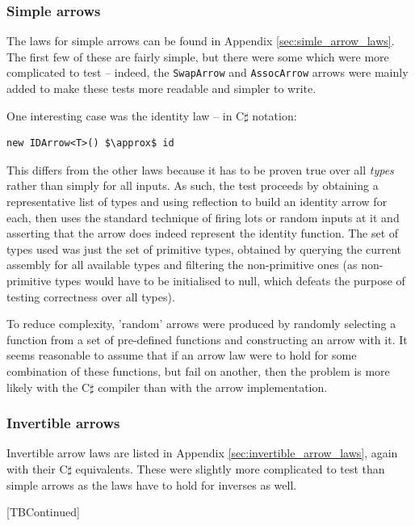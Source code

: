 \documentclass[12pt,twoside,notitlepage]{report}
\begin{document}
\subsubsection{Simple arrows}

The laws for simple arrows can be found in Appendix \ref{sec:simle_arrow_laws}. The first few of these are fairly simple, but there were some which were more complicated to test -- indeed, the \texttt{SwapArrow} and \texttt{AssocArrow} arrows were mainly added to make these tests more readable and simpler to write.

One interesting case was the identity law -- in C$\sharp$ notation:

\begin{lstlisting}[mathescape]
new IDArrow<T>() $\approx$ id
\end{lstlisting}

This differs from the other laws because it has to be proven true over all \textit{types} rather than simply for all inputs. As such, the test proceeds by obtaining a representative list of types and using reflection to build an identity arrow for each, then uses the standard technique of firing lots or random inputs at it and asserting that the arrow does indeed represent the identity function. The set of types used was just the set of primitive types, obtained by querying the current assembly for all available types and filtering the non-primitive ones (as non-primitive types would have to be initialised to null, which defeats the purpose of testing correctness over all types).

To reduce complexity, 'random' arrows were produced by randomly selecting a function from a set of pre-defined functions and constructing an arrow with it. It seems reasonable to assume that if an arrow law were to hold for some combination of these functions, but fail on another, then the problem is more likely with the C$\sharp$ compiler than with the arrow implementation.

\subsubsection{Invertible arrows}

Invertible arrow laws are listed in Appendix \ref{sec:invertible_arrow_laws}, again with their C$\sharp$ equivalents. These were slightly more complicated to test than simple arrows as the laws have to hold for inverses as well.

[TBContinued]
\end{document}
